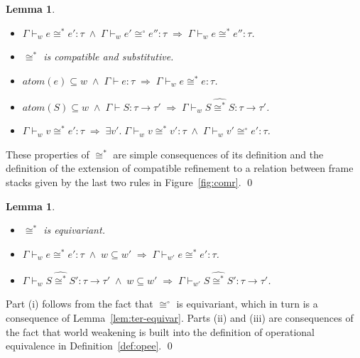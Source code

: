 \documentclass{LMCS}
\theoremstyle{plain}
\newtheorem{lemma}[thm]{Lemma}
\theoremstyle{definition}
\newcommand{\atoms}{\mathit{atom}}
\renewcommand{\conj}{\wedge}
\newcommand{\CR}[1]{\mathrel{\widehat{#1}}}
\newcommand{\ent}{\vdash}
\newcommand{\enty}{\vdash}
\renewcommand{\exp}[1][e]{#1}
\newcommand{\FUNTY}{\mathbin{\rightarrow}}
\newcommand{\imp}{\Rightarrow}
\newcommand{\ofty}{:}
\newcommand{\opeq}{\cong}
\newcommand{\opeqo}{\cong^{\circ}}
\newcommand{\stk}[1][S]{#1}
\newcommand{\ty}{\tau}
\newcommand{\val}[1][v]{#1}
\newcommand{\w}[1][w]{#1}
\begin{document}
\begin{lemma}
  \label{lem:howe-1}\hfill
  \begin{itemize}
  \item[(i)] $\Gamma\ent_{\w}\exp\opeq^*\exp'\ofty\ty \;\conj\;
    \Gamma\ent_{\w}\exp'\opeqo\exp''\ofty\ty \;\imp\;
    \Gamma\ent_{\w}\exp\opeq^*\exp''\ofty\ty$.

  \item[(ii)] $\opeq^*$ is compatible and substitutive.

  \item[(iii)] $\atoms(\exp)\subseteq\w \;\conj\;
    \Gamma\enty\exp\ofty\ty \;\imp\;
    \Gamma\ent_{\w}\exp\opeq^*\exp\ofty\ty$.

  \item[(iv)] $\atoms(\stk)\subseteq\w \;\conj\;
    \Gamma\enty\stk\ofty\ty\FUNTY\ty' \;\imp\; \Gamma\ent_{\w}\stk
    \CR{\opeq^*}\stk \ofty\ty\FUNTY\ty'$.

  \item[(v)] $\Gamma\ent_{\w}\val\opeq^*\exp'\ofty\ty \;\imp\;\exists
    \val'.\;\Gamma\ent_{\w}\val\opeq^* \val'\ofty\ty \;\conj\;
    \Gamma\ent_{\w}\val'\opeqo\exp'\ofty\ty$.
  \end{itemize}
\end{lemma}
\proof
  These properties of $\opeq^*$ are simple consequences of its
  definition and the definition of the extension of compatible
  refinement to a relation between frame stacks given by the last two
  rules in Figure~\ref{fig:comr}.
\qed

\begin{lemma}
  \label{lem:howe-2}\hfill
  \begin{itemize}
  \item[(i)] $\opeq^*$ is equivariant.

  \item[(ii)] $\Gamma\ent_{\w}\exp\opeq^*\exp'\ofty\ty \;\conj\;
    \w\subseteq\w' \;\imp\; \Gamma\ent_{\w'}\exp\opeq^*\exp'\ofty\ty$.

  \item[(iii)] $\Gamma\ent_{\w}\stk \CR{\opeq^*} \stk'
    \ofty\ty\FUNTY\ty' \;\conj\; \w\subseteq\w' \;\imp\;
    \Gamma\ent_{\w'}\stk\CR{\opeq^*} \stk' \ofty\ty\FUNTY\ty'$.
  \end{itemize}
  
\end{lemma}
\proof
  Part (i) follows from the fact that $\opeqo$ is equivariant, which
  in turn is a consequence of Lemma~\ref{lem:ter-equivar}. Parts (ii)
  and (iii) are consequences of the fact that world weakening is built
  into the definition of operational equivalence in
  Definition~\ref{def:opee}.
\qed
\end{document}
